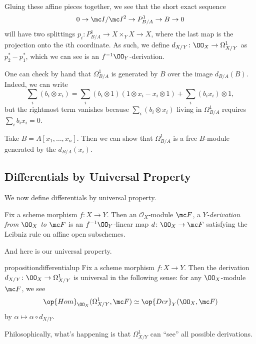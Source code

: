 \documentclass[../notes.tex]{subfiles}
\begin{document}
Gluing these affine pieces together, we see that the short exact sequence
\[0\to\mc I/\mc I^2\to P^1_{B/A}\to B\to0\]
will have two splittings $p_i\colon P^1_{B/A}\to X\times_YX\to X$, where the last map is the projection onto the $i$th coordinate. As such, we define $d_{X/Y}\colon\OO_X\to\Omega^1_{X/Y}$ as $p_2^*-p_1^*$, which we can see is an $f^{-1}\OO_Y$-derivation.
\begin{remark}
	One can check by hand that $\Omega^1_{B/A}$ is generated by $B$ over the image $d_{B/A}(B)$. Indeed, we can write
	\[\sum_i(b_i\otimes x_i)=\sum_i(b_i\otimes1)(1\otimes x_i-x_i\otimes1)+\sum_i(b_ix_i)\otimes1,\]
	but the rightmost term vanishes because $\sum_i(b_i\otimes x_i)$ living in $\Omega^1_{B/A}$ requires $\sum_ib_ix_i=0$.
\end{remark}
\begin{example}
	Take $B=A[x_1,\ldots,x_n]$. Then we can show that $\Omega^1_{B/A}$ is a free $B$-module generated by the $d_{B/A}(x_i)$.
\end{example}

\subsection{Differentials by Universal Property}
We now define differentials by universal property.
\begin{definition}[Derivation]
	Fix a scheme morphism $f\colon X\to Y$. Then an $\mathcal O_X$-module $\mc F$, a \textit{$Y$-derivation from $\OO_X$ to $\mc F$} is an $f^{-1}\OO_Y$-linear map $d\colon\OO_X\to\mc F$ satisfying the Leibniz rule on affine open subschemes.
\end{definition}
And here is our universal property.
\begin{restatable}{proposition}{differentialup} \label{prop:diff-up}
	Fix a scheme morphism $f\colon X\to Y$. Then the derivation $d_{X/Y}\colon\OO_X\to\Omega^1_{X/Y}$ is universal in the following sense: for any $\OO_X$-module $\mc F$, we see
	\[\op{Hom}_{\OO_X}(\Omega^1_{X/Y},\mc F)\simeq\op{Der}_Y(\OO_X,\mc F)\]
	by $\alpha\mapsto\alpha\circ d_{X/Y}$.
\end{restatable}
\noindent Philosophically, what's happening is that $\Omega^1_{X/Y}$ can ``see'' all possible derivations.
\end{document}
